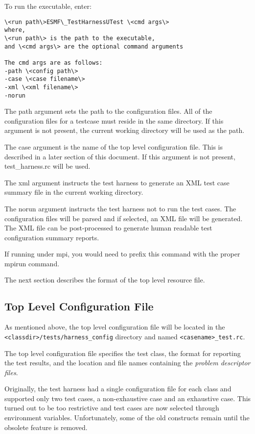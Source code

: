 To run the executable, enter:
\begin{verbatim}
\<run path\>ESMF\_TestHarnessUTest \<cmd args\>
where,
\<run path\> is the path to the executable,
and \<cmd args\> are the optional command arguments

The cmd args are as follows:
-path \<config path\>
-case \<case filename\>
-xml \<xml filename\>
-norun

\end{verbatim}

The path argument sets the path to the configuration files.  All of the configuration files 
for a testcase must reside in the same directory.  If this argument is not present, the current working directory
will be used as the path.

The case argument is the name of the top level configuration file.  This is described in a later 
section of this document.  If this argument is not present, test\_harness.rc will be used.

The xml argument instructs the test harness to generate an XML test case summary file 
in the current working directory.

The norun argument instructs the test harness not to run the test cases.  The configuration files will be parsed
and if selected, an XML file will be generated.  The XML file can be post-processed to generate human
readable test configuration summary reports.

If running under mpi, you would need to prefix this command with the proper mpirun command.

The next section describes the format of the top level resource file.

\subsection{Top Level Configuration File}
\label{sec:harness_toplevelfile}
As mentioned above, the top level configuration file will be located in the 
\texttt{<classdir>/tests/harness\_config} directory and named \texttt{<casename>\_test.rc}.
 
The top level configuration file specifies the test class, the 
format for reporting the test results, and the location and file names containing 
the \textit{problem descriptor files}. 

Originally, the test harness had a single configuration file for each class and 
supported only two test cases, a non-exhaustive case and an exhaustive case.
This turned out to be too restrictive and test cases are now selected through environment variables.
Unfortunately, some of the old constructs remain until the obsolete feature is removed.

